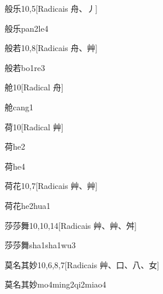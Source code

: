 \begin{entry}{般乐}{10,5}[Radicais ⾈、⼃]
  \begin{phonetics}{般乐}{pan2le4}
  \end{phonetics}
\end{entry}

\begin{entry}{般若}{10,8}[Radicais ⾈、⾋]
  \begin{phonetics}{般若}{bo1re3}
  \end{phonetics}
\end{entry}

\begin{entry}{舱}{10}[Radical ⾈]
  \begin{phonetics}{舱}{cang1}
  \end{phonetics}
\end{entry}

\begin{entry}{荷}{10}[Radical ⾋]
  \begin{phonetics}{荷}{he2}
  \end{phonetics}
  \begin{phonetics}{荷}{he4}
  \end{phonetics}
\end{entry}

\begin{entry}{荷花}{10,7}[Radicais ⾋、⾋]
  \begin{phonetics}{荷花}{he2hua1}
  \end{phonetics}
\end{entry}

\begin{entry}{莎莎舞}{10,10,14}[Radicais ⾋、⾋、⾇]
  \begin{phonetics}{莎莎舞}{sha1sha1wu3}
  \end{phonetics}
\end{entry}

\begin{entry}{莫名其妙}{10,6,8,7}[Radicais ⾋、⼝、⼋、⼥]
  \begin{phonetics}{莫名其妙}{mo4ming2qi2miao4}
  \end{phonetics}
\end{entry}

